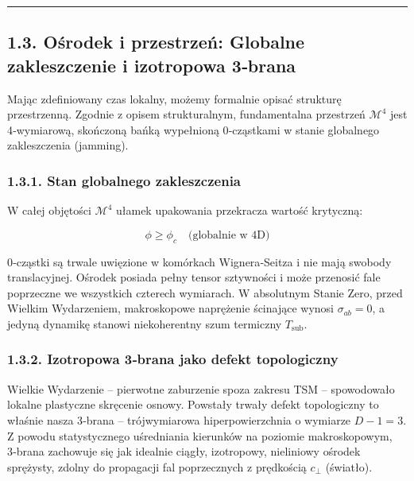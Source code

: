 \documentclass[
  letterpaper,
  DIV=11,
  numbers=noendperiod]{scrartcl}
\numberwithin{equation}{subsection}
\begin{document}
\begin{center}\rule{0.5\linewidth}{0.5pt}\end{center}

\subsection{1.3. Ośrodek i przestrzeń: Globalne zakleszczenie i
izotropowa
3‑brana}\label{oux15brodek-i-przestrzeux144-globalne-zakleszczenie-i-izotropowa-3brana}

Mając zdefiniowany czas lokalny, możemy formalnie opisać strukturę
przestrzenną. Zgodnie z opisem strukturalnym, fundamentalna przestrzeń
\(\mathcal{M}^4\) jest 4‑wymiarową, skończoną bańką wypełnioną
0‑cząstkami w stanie globalnego zakleszczenia (jamming).

\subsubsection{1.3.1. Stan globalnego
zakleszczenia}\label{stan-globalnego-zakleszczenia}

W całej objętości \(\mathcal{M}^4\) ułamek upakowania przekracza wartość
krytyczną:

\[\phi \ge \phi_c \quad \text{(globalnie w 4D)} \tag{1.3.1}\]

0‑cząstki są trwale uwięzione w komórkach Wignera‑Seitza i nie mają
swobody translacyjnej. Ośrodek posiada pełny tensor sztywności i może
przenosić fale poprzeczne we wszystkich czterech wymiarach. W absolutnym
Stanie Zero, przed Wielkim Wydarzeniem, makroskopowe naprężenie
ścinające wynosi \(\sigma_{ab} = 0\), a jedyną dynamikę stanowi
niekoherentny szum termiczny \(T_{\text{sub}}\).

\subsubsection{1.3.2. Izotropowa 3‑brana jako defekt
topologiczny}\label{izotropowa-3brana-jako-defekt-topologiczny}

Wielkie Wydarzenie -- pierwotne zaburzenie spoza zakresu TSM --
spowodowało lokalne plastyczne skręcenie osnowy. Powstały trwały defekt
topologiczny to właśnie nasza 3‑brana -- trójwymiarowa hiperpowierzchnia
o wymiarze \(D-1 = 3\). Z powodu statystycznego uśredniania kierunków na
poziomie makroskopowym, 3‑brana zachowuje się jak idealnie ciągły,
izotropowy, nieliniowy ośrodek sprężysty, zdolny do propagacji fal
poprzecznych z prędkością \(c_{\perp}\) (światło).
\end{document}
